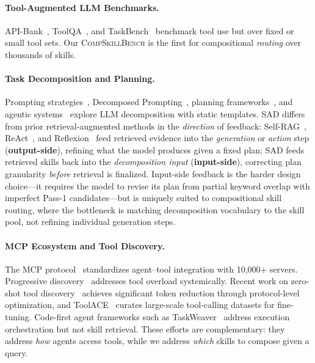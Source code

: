 \documentclass[11pt]{article}
\newcommand{\benchmark}{\textsc{CompSkillBench}}
\begin{document}
\paragraph{Tool-Augmented LLM Benchmarks.}
API-Bank~\cite{li2023apibank}, ToolQA~\cite{zhuang2024toolqa}, and TaskBench~\cite{shen2023taskbench} benchmark tool use but over fixed or small tool sets.
Our \benchmark{} is the first for compositional \emph{routing} over thousands of skills.

\paragraph{Task Decomposition and Planning.}
Prompting strategies~\cite{wei2022chain,zhou2022least}, Decomposed Prompting~\cite{khot2023decomposed}, planning frameworks~\cite{huang2022language,wang2023plan,wang2023planexecute}, and agentic systems~\cite{yao2023react,shen2023hugginggpt} explore LLM decomposition with static templates.
SAD differs from prior retrieval-augmented methods in the \emph{direction} of feedback: Self-RAG~\cite{asai2024selfrag}, ReAct~\cite{yao2023react}, and Reflexion~\cite{shinn2023reflexion} feed retrieved evidence into the \emph{generation} or \emph{action} step (\textbf{output-side}), refining what the model produces given a fixed plan; SAD feeds retrieved skills back into the \emph{decomposition input} (\textbf{input-side}), correcting plan granularity \emph{before} retrieval is finalized. Input-side feedback is the harder design choice---it requires the model to revise its plan from partial keyword overlap with imperfect Pass-1 candidates---but is uniquely suited to compositional skill routing, where the bottleneck is matching decomposition vocabulary to the skill pool, not refining individual generation steps.

\paragraph{MCP Ecosystem and Tool Discovery.}
The MCP protocol~\cite{anthropic2024mcp} standardizes agent--tool integration with 10,000+ servers.
Progressive discovery~\cite{qin2023toolllm} addresses tool overload systemically.
Recent work on zero-shot tool discovery~\cite{mcpzero2025} achieves significant token reduction through protocol-level optimization, and ToolACE~\cite{toolace2025} curates large-scale tool-calling datasets for fine-tuning.
Code-first agent frameworks such as TaskWeaver~\cite{qiao2024taskweaver} address execution orchestration but not skill retrieval.
These efforts are complementary: they address \emph{how} agents access tools, while we address \emph{which} skills to compose given a query.
\end{document}
